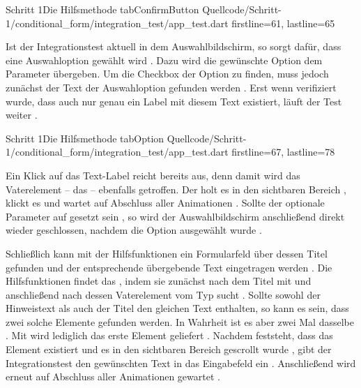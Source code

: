 \begin{alexlisting}{Schritt 1}{Die Hilfsmethode tabConfirmButton}
  {Quellcode/Schritt-1/conditional_form/integration_test/app_test.dart}
  {firstline=61, lastline=65}
  \label{lst:Schritt1HilfsmethodeTabSelectionCard}
\end{alexlisting}

Ist der Integrationstest aktuell in dem Auswahlbildschirm, so sorgt  dafür, dass eine Auswahloption gewählt wird \Lst{\ref{lst:Schritt1HilfsmethodeTabOption}}.
Dazu wird die gewünschte Option dem Parameter  übergeben.
Um die Checkbox der Option zu finden, muss jedoch zunächst der Text der Auswahloption gefunden werden .
Erst wenn verifiziert wurde, dass auch nur genau ein Label mit diesem Text existiert, läuft der Test weiter . 

\begin{alexlisting}{Schritt 1}{Die Hilfsmethode tabOption}
  {Quellcode/Schritt-1/conditional_form/integration_test/app_test.dart}
  {firstline=67, lastline=78}
  \label{lst:Schritt1HilfsmethodeTabOption}
\end{alexlisting}

Ein Klick auf das Text-Label reicht bereits aus, denn damit wird das Vaterelement -- das  -- ebenfalls getroffen.
Der  holt es in den sichtbaren Bereich , klickt es  und wartet auf Abschluss aller Animationen .
Sollte der optionale Parameter  auf  gesetzt sein , so wird der Auswahlbildschirm anschließend direkt wieder geschlossen, nachdem die Option ausgewählt wurde  . 
  
Schließlich kann mit der Hilfsfunktionen  ein Formularfeld über dessen Titel gefunden und der entsprechende übergebende Text eingetragen werden \Lst{\ref{lst:Schritt1HilfsmethodeFillTextFormField}}.
Die Hilfsfunktionen findet das , indem sie zunächst nach dem Titel mit  und anschließend nach dessen Vaterelement vom Typ  sucht . Sollte sowohl der Hinweistext als auch der Titel den gleichen Text enthalten, so kann es sein, dass zwei solche Elemente gefunden werden. In Wahrheit ist es aber zwei Mal dasselbe . Mit  wird lediglich das erste Element geliefert .
Nachdem feststeht, dass das Element existiert  und es in den sichtbaren Bereich gescrollt wurde , gibt der Integrationstest den gewünschten Text in das Eingabefeld ein .
Anschließend wird erneut auf Abschluss aller Animationen gewartet .

